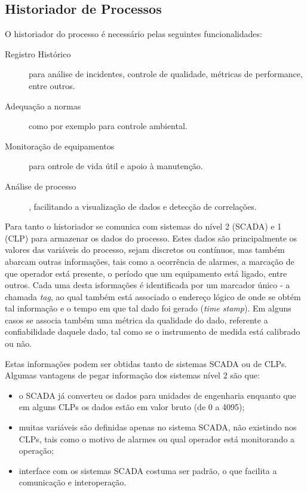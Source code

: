\subsection{Historiador de Processos}
O historiador do processo é necessário pelas seguintes funcionalidades:
\begin{description}
 	\item[Registro Histórico] para análise de incidentes, controle de qualidade, métricas de performance, entre outros.
 	\item[Adequação a normas] como por exemplo para controle ambiental.
 	\item[Monitoração de equipamentos] para ontrole de vida útil e apoio à manutenção.
 	\item[Análise de processo], facilitando a visualização de dados e detecção de correlações.
 \end{description}  			

Para tanto o historiador se comunica com sistemas do nível 2 (SCADA) e 1 (CLP) para armazenar os dados do processo. Estes dados são principalmente os valores das variáveis do processo, sejam discretos ou contínuos, mas também abarcam outras informações, tais como a ocorrência de alarmes, a marcação de que operador está presente, o período que um equipamento está ligado, entre outros. Cada uma desta isformações é identificada por um marcador único - a chamada \emph{tag}, ao qual também está associado o endereço lógico de onde se obtém tal informação e o tempo em que tal dado foi gerado (\emph{time stamp}). Em alguns casos se associa também uma métrica da qualidade do dado, referente a confiabilidade daquele dado, tal como se o instrumento de medida está calibrado ou não.

Estas informações podem ser obtidas tanto de sistemas SCADA ou de CLPs. Algumas vantagens de pegar informação dos sistemas nível 2 são que: 
\begin{itemize}
	\item o SCADA já converteu os dados para unidades de engenharia enquanto que em alguns CLPs os dados estão em valor bruto (de 0 a 4095);
	\item muitas variáveis são definidas apenas no sistema SCADA, não existindo nos CLPs, tais como o motivo de alarmes ou qual operador está monitorando a operação;
	\item  interface com os sistemas SCADA costuma ser padrão, o que facilita a comunicação e interoperação.
\end{itemize}

